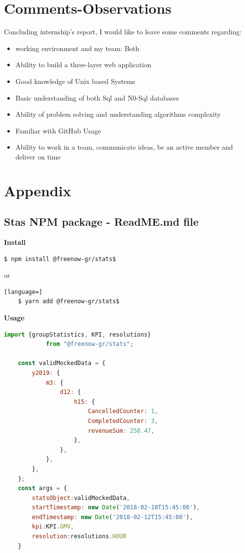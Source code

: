 
\chapter{Comments-Observations} %

\label{Chapter7}

Concluding internship's report, I would like to leave some comments regarding:

\begin{itemize}
	\item working environment and my team: Both 
	\item Ability to build a three-layer web application
	\item Good knowledge of Unix based Systems
	\item Basic understanding of both Sql and N0-Sql databases
	\item Ability of problem solving and understanding algorithms complexity
	\item Familiar with GitHub Usage
	\item Ability to work in a team, communicate ideas, be an active member and deliver on time
\end{itemize}


\chapter{Appendix}

\section{Stas NPM package - ReadME.md file}
	\textbf{Install}
	
	\begin{lstlisting}[language=bash]
	$ npm install @freenow-gr/stats$
	\end{lstlisting}
	
	or
	
	\begin{lstlisting}[language=]
	$ yarn add @freenow-gr/stats$
	\end{lstlisting}

	\textbf{Usage}
	
	\begin{lstlisting}[language=JavaScript]
	import {groupStatistics, KPI, resolutions} 
			from "@freenow-gr/stats";
	
	const validMockedData = {
		y2019: {
			m3: {
				d12: {
					h15: {
						CancelledCounter: 1,
						CompletedCounter: 3,
						revenueSum: 258.47,
					},
				},
			},
		},
	};	
	const args = {
		statsObject:validMockedData, 
		startTimestamp: new Date('2018-02-10T15:45:00'), 
		endTimestamp: new Date('2018-02-12T15:45:00'), 
		kpi:KPI.GMV, 
		resolution:resolutions.HOUR
	}
	\end{lstlisting}
	
